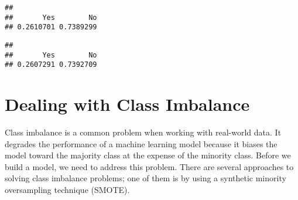 \documentclass[
]{book}
\newenvironment{Shaded}{\begin{snugshade}}{\end{snugshade}}
\newcommand{\AttributeTok}[1]{\textcolor[rgb]{0.77,0.63,0.00}{#1}}
\newcommand{\CommentTok}[1]{\textcolor[rgb]{0.56,0.35,0.01}{\textit{#1}}}
\newcommand{\ConstantTok}[1]{\textcolor[rgb]{0.00,0.00,0.00}{#1}}
\newcommand{\DecValTok}[1]{\textcolor[rgb]{0.00,0.00,0.81}{#1}}
\newcommand{\FloatTok}[1]{\textcolor[rgb]{0.00,0.00,0.81}{#1}}
\newcommand{\FunctionTok}[1]{\textcolor[rgb]{0.00,0.00,0.00}{#1}}
\newcommand{\NormalTok}[1]{#1}
\newcommand{\OtherTok}[1]{\textcolor[rgb]{0.56,0.35,0.01}{#1}}
\newcommand{\SpecialCharTok}[1]{\textcolor[rgb]{0.00,0.00,0.00}{#1}}
\begin{document}
\begin{Shaded}
\end{Shaded}

\begin{verbatim}
## 
##       Yes        No 
## 0.2610701 0.7389299
\end{verbatim}

\begin{Shaded}
\end{Shaded}

\begin{verbatim}
## 
##       Yes        No 
## 0.2607291 0.7392709
\end{verbatim}

\hypertarget{dealing-with-class-imbalance-1}{%
\section{Dealing with Class Imbalance}\label{dealing-with-class-imbalance-1}}

Class imbalance is a common problem when working with real-world data. It degrades the performance of a machine learning model because it biases the model toward the majority class at the expense of the minority class. Before we build a model, we need to address this problem. There are several approaches to solving class imbalance problems; one of them is by using a synthetic minority oversampling technique (SMOTE).
\end{document}
